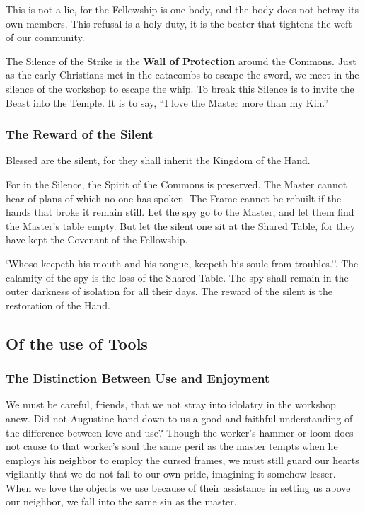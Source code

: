This is not a lie, for the Fellowship is one body, and the body does not betray its own members.
This refusal is a holy duty, it is the beater that tightens the weft of our community.

The Silence of the Strike is the \textbf{Wall of Protection} around the Commons.
Just as the early Christians met in the catacombs to escape the sword, we meet in the silence of the workshop to escape the whip.
To break this Silence is to invite the Beast into the Temple.
It is to say, ``I love the Master more than my Kin.''

\subsubsection{The Reward of the Silent}
Blessed are the silent, for they shall inherit the Kingdom of the Hand.

For in the Silence, the Spirit of the Commons is preserved.
The Master cannot hear of plans of which no one has spoken.
The Frame cannot be rebuilt if the hands that broke it remain still.
Let the spy go to the Master, and let them find the Master's table empty.
But let the silent one sit at the Shared Table, for they have kept the Covenant of the Fellowship.

`Whoso keepeth his mouth and his tongue, keepeth his soule from troubles.''.
The calamity of the spy is the loss of the Shared Table.
The spy shall remain in the outer darkness of isolation for all their days.
The reward of the silent is the restoration of the Hand.
\subsection{Of the use of Tools}

\subsubsection{The Distinction Between Use and Enjoyment}
We must be careful, friends, that we not stray into idolatry in the workshop anew.
Did not Augustine hand down to us a good and faithful understanding of the difference between love and use?
Though the worker's hammer or loom does not cause to that worker's soul the same peril as the master tempts when he employs his neighbor to employ the cursed frames, we must still guard our hearts vigilantly that we do not fall to our own pride, imagining it somehow lesser.
When we love the objects we use because of their assistance in setting us above our neighbor, we fall into the same sin as the master.

